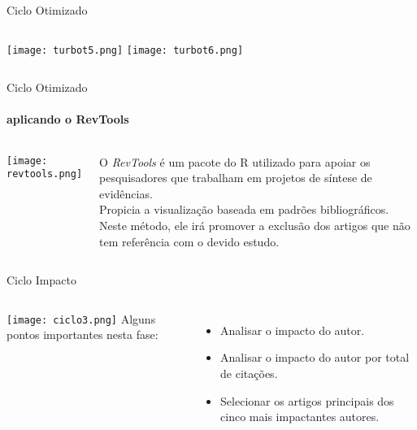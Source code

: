 \begin{frame}[c]{Ciclo Otimizado}
    
    \begin{columns}
            \centering
            \texttt{[image: turbot5.png]}
            \centering
            \texttt{[image: turbot6.png]}

    \end{columns}

\end{frame}
\begin{frame}[c]{Ciclo Otimizado}
    \framesubtitle{aplicando o RevTools}
    \begin{columns}
            \centering
            \texttt{[image: revtools.png]}
    
            O \emph{RevTools} é um pacote do R utilizado para apoiar os pesquisadores que trabalham em projetos de síntese de evidências. \\
            Propicia a visualização baseada em padrões bibliográficos.\\
            Neste método, ele irá promover a exclusão dos artigos que não tem referência com o devido estudo.

    \end{columns}

\end{frame}
\begin{frame}[c]{Ciclo Impacto}
    \begin{columns}
            \centering
            \texttt{[image: ciclo3.png]}
            Alguns pontos importantes nesta fase:
            \begin{itemize}
                \item Analisar o impacto do autor.
                \item Analisar o impacto do autor por total de citações.
                \item Selecionar os artigos principais dos cinco mais impactantes autores.
            \end{itemize}
        
    \end{columns}

\end{frame}
